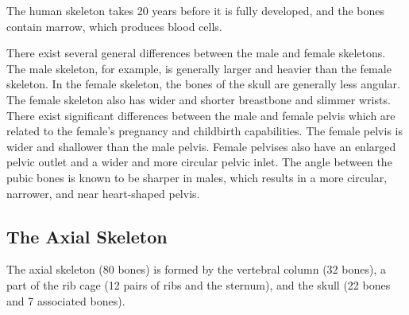 The human skeleton takes 20 years before it is fully developed, and the bones contain marrow, which produces blood cells.

There exist several general differences between the male and female skeletons. The male skeleton, for example, is generally larger and heavier than the female skeleton. In the female skeleton, the bones of the skull are generally less angular. The female skeleton also has wider and shorter breastbone and slimmer wrists. There exist significant differences between the male and female pelvis which are related to the female's pregnancy and childbirth capabilities. The female pelvis is wider and shallower than the male pelvis. Female pelvises also have an enlarged pelvic outlet and a wider and more circular pelvic inlet. The angle between the pubic bones is known to be sharper in males, which results in a more circular, narrower, and near heart-shaped pelvis.

\hypertarget{the-axial-skeleton}{%
\subsection{The Axial Skeleton}\label{the-axial-skeleton}}

The axial skeleton (80 bones) is formed by the vertebral column (32 bones), a part of the rib cage (12 pairs of ribs and the sternum), and the skull (22 bones and 7 associated bones).



